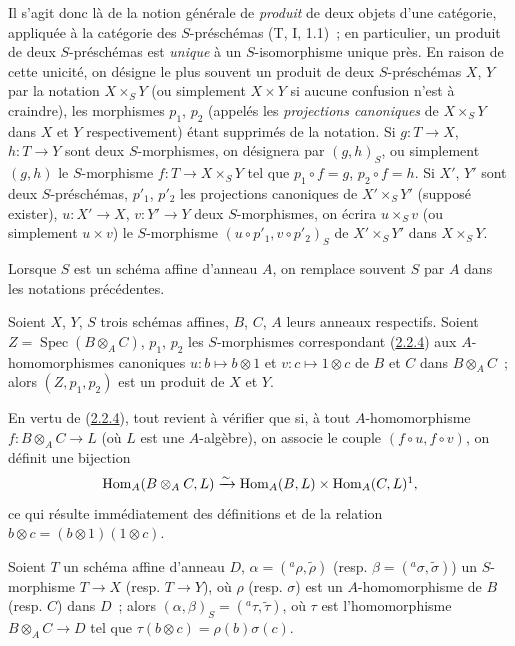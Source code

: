 Il s'agit donc là de la notion générale de \emph{produit} de deux objets d'une
catégorie, appliquée à la catégorie des $S$-préschémas (T, I, 1.1)~; en
particulier, un produit de deux $S$-préschémas est \emph{unique} à un
$S$-isomorphisme unique près. En raison de cette unicité, on désigne le plus
souvent un produit de deux $S$-préschémas $X$, $Y$ par la notation
$X\times_S Y$ (ou simplement $X\times Y$ si aucune confusion n'est à craindre),
les morphismes $p_1$, $p_2$ (appelés les \emph{projections canoniques} de
$X\times_S Y$ dans $X$ et $Y$ respectivement) étant supprimés de la notation.
Si $g:T\to X$, $h:T\to Y$ sont deux $S$-morphismes, on désignera par
$(g,h)_S$, ou simplement $(g,h)$ le $S$-morphisme
$f:T\to X\times_S Y$ tel que $p_1\circ f=g$, $p_2\circ f=h$. Si $X'$, $Y'$
sont deux $S$-préschémas, $p'_1$, $p'_2$ les projections canoniques de
$X'\times_S Y'$ (supposé exister), $u:X'\to X$, $v:Y'\to Y$ deux
$S$-morphismes, on écrira $u\times_S v$ (ou simplement $u\times v$) le
$S$-morphisme $(u\circ p'_1,v\circ p'_2)_S$ de $X'\times_S Y'$ dans
$X\times_S Y$.

Lorsque $S$ est un schéma affine d'anneau $A$, on remplace souvent $S$ par $A$
dans les notations précédentes.

\begin{proposition}[3.2.2]
\label{I.3.2.2-fr}
Soient $X$, $Y$, $S$ trois schémas affines, $B$, $C$, $A$ leurs anneaux
respectifs. Soient $Z=\operatorname{Spec}(B\otimes_A C)$, $p_1$, $p_2$ les
$S$-morphismes correspondant (\hyperref[I.2.2.4-fr]{2.2.4}) aux
$A$-homomorphismes canoniques $u:b\mapsto b\otimes1$ et
$v:c\mapsto1\otimes c$ de $B$ et $C$ dans $B\otimes_A C$~; alors
$(Z,p_1,p_2)$ est un produit de $X$ et $Y$.
\end{proposition}

En vertu de (\hyperref[I.2.2.4-fr]{2.2.4}), tout revient à vérifier que si, à
tout $A$-homomorphisme $f:B\otimes_A C\to L$ (où $L$ est une $A$-algèbre), on
associe le couple $(f\circ u,f\circ v)$, on définit une bijection
\[
  \operatorname{Hom}_A(B\otimes_A C,L)\xrightarrow{\sim}
  \operatorname{Hom}_A(B,L)\times\operatorname{Hom}_A(C,L)\footnotemark,
\]
 ce qui résulte immédiatement des définitions
et de la relation $b\otimes c=(b\otimes1)(1\otimes c)$.

\begin{corollary}[3.2.3]
\label{I.3.2.3-fr}
Soient $T$ un schéma affine d'anneau $D$,
$\alpha=({}^a\rho,\widetilde{\rho})$
(resp. $\beta=({}^a\sigma,\widetilde{\sigma})$) un $S$-morphisme $T\to X$
(resp. $T\to Y$), où $\rho$ (resp. $\sigma$) est un $A$-homomorphisme de $B$
(resp. $C$) dans $D$~; alors
$(\alpha,\beta)_S=({}^a\tau,\widetilde{\tau})$, où $\tau$ est l'homomorphisme
$B\otimes_A C\to D$ tel que $\tau(b\otimes c)=\rho(b)\sigma(c)$.
\end{corollary}

